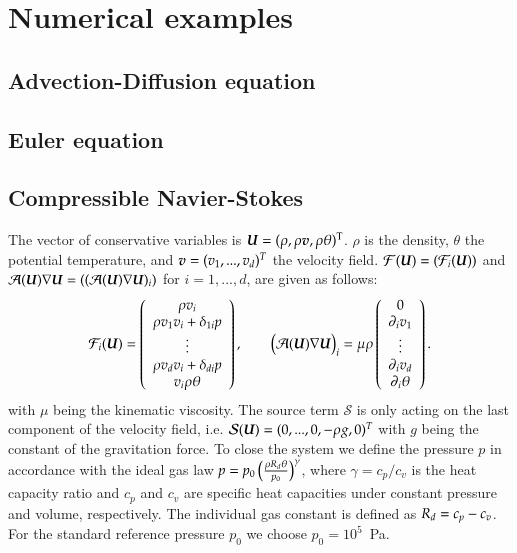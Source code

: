 \section{Numerical examples}


\subsection{Advection-Diffusion equation}

\subsection{Euler equation}

\subsection{Compressible Navier-Stokes}
The vector of conservative variables is $\boldsymbol{U}=(\rho, \rho\boldsymbol{v}, \rho\theta)^{\mathrm{T}}$.
$\rho$ is the density, $\theta$ the potential temperature, and
$\boldsymbol{v}=(v_1,...,v_d)^T$ the velocity field.
$\mathcal{F}(\boldsymbol{U}) = (\mathcal{F}_i(\boldsymbol{U}))$ and
$\mathcal{A}(\boldsymbol{U})\nabla\boldsymbol{U} = ((\mathcal{A}(\boldsymbol{U})\nabla \boldsymbol{U})_i )$ for $i=1,...,d$, are
given as follows:
\begin{equation}
   \mathcal{F}_i(\boldsymbol{U})=\left(\begin{array}{c}
    \rho v_i \\
    \rho v_1 v_i  + \delta_{1i}p \\
    \vdots \\
    \rho v_d v_i + \delta_{di} p \\
    v_i \rho\theta  \\
  \end{array}\right),\qquad 
  \big (\mathcal{A}(\boldsymbol{U})\nabla\boldsymbol{U} \big )_i =\mu\rho\left(\begin{array}{c}
    0                \\
    \partial_i v_1   \\ 
    \vdots           \\ 
    \partial_i v_d   \\
    \partial_i\theta \\
  \end{array}\right).
\end{equation}
with $\mu$ being the kinematic viscosity.
The source term $\mathcal{S}$ is only acting on the last component of the velocity field, i.e.
$\mathcal{S}(\boldsymbol{U}) = (0,...,0,-\rho g,0)^T$ with
$g$ being the constant of the gravitation force.
To close the system we define the pressure $p$ in accordance with the
ideal gas law $p = p_0\left(\frac{\rho R_d\theta}{p_0}\right)^\gamma$,
where $\gamma=c_p/c_v$ is the heat capacity ratio and $c_p$ and $c_v$ are specific
heat capacities under constant pressure and volume, respectively.
The individual gas constant is defined as $R_d=c_p-c_v$.
For the standard reference pressure $p_0$ we choose $p_0=10^5$~Pa.

